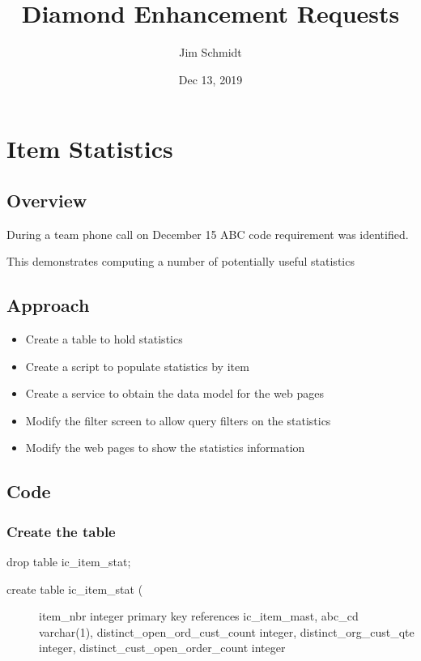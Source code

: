 \documentclass[letterpaper,10pt,english]{sphinxmanual}
\title{Diamond Enhancement Requests}
\date{Dec 13, 2019}
\author{Jim Schmidt}
\begin{document}
\pagestyle{empty}
\sphinxmaketitle
\pagestyle{plain}
\sphinxtableofcontents
\pagestyle{normal}
\label{\detokenize{index::doc}}



\chapter{Item Statistics}
\label{\detokenize{IcItemStat:item-statistics}}\label{\detokenize{IcItemStat::doc}}

\section{Overview}
\label{\detokenize{IcItemStat:overview}}
During a team phone call on December 15 ABC code requirement was
identified.

This demonstrates computing a number of potentially useful statistics


\section{Approach}
\label{\detokenize{IcItemStat:approach}}\begin{itemize}
\item {} 
Create a table to hold statistics

\item {} 
Create a script to populate statistics by item

\item {} 
Create a service to obtain the data model for the web pages

\item {} 
Modify the filter screen to allow query filters on the statistics

\item {} 
Modify the web pages to show the statistics information

\end{itemize}


\section{Code}
\label{\detokenize{IcItemStat:code}}

\subsection{Create the table}
\label{\detokenize{IcItemStat:create-the-table}}
drop table ic\_item\_stat;
\begin{description}
\item[{create table ic\_item\_stat (}] \leavevmode
item\_nbr integer primary key references ic\_item\_mast,
abc\_cd  varchar(1),
distinct\_open\_ord\_cust\_count integer,
distinct\_org\_cust\_qte          integer,
distinct\_cust\_open\_order\_count integer

\end{description}
\end{document}
